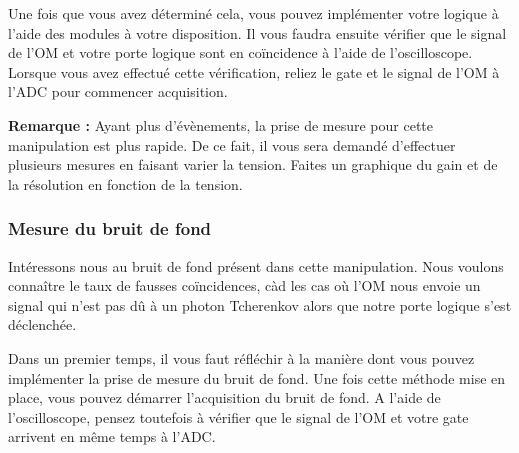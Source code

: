 Une fois que vous avez déterminé cela, vous pouvez implémenter votre logique à l'aide des modules à votre disposition. Il vous faudra ensuite vérifier que le signal de l'OM et votre porte logique sont en coïncidence à l'aide de l'oscilloscope. Lorsque vous avez effectué cette vérification, reliez le gate et le signal de l'OM à l'ADC pour commencer acquisition.

\textbf{Remarque :} Ayant plus d'évènements, la prise de mesure pour cette manipulation est plus rapide. De ce fait, il vous sera demandé d'effectuer plusieurs mesures en faisant varier la tension. Faites un graphique du gain et de la résolution en fonction de la tension.


\subsubsection{Mesure du bruit de fond}
Intéressons nous au bruit de fond présent dans cette manipulation. Nous voulons connaître le taux de fausses coïncidences, càd les cas où l'OM nous envoie un signal qui n'est pas dû à un photon Tcherenkov alors que notre porte logique s'est déclenchée.

Dans un premier temps, il vous faut réfléchir à la manière dont vous pouvez implémenter la prise de mesure du bruit de fond. Une fois cette méthode mise en place, vous pouvez démarrer l'acquisition du bruit de fond. A l'aide de l'oscilloscope, pensez toutefois à vérifier que le signal de l'OM et votre gate arrivent en même temps à l'ADC.



